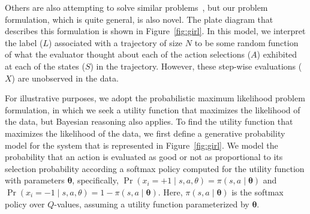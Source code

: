 Others are also attempting to solve similar problems~\cite{burchfiel2016distance,shiarlis2016inverse}, 
but our problem formulation, which is quite general, is also novel.
%
The plate diagram that describes this formulation is shown
in Figure~\ref{fig:girl}.  In this model, we interpret the label ($L$)
associated with a trajectory of size $N$ to be some random function of
what the evaluator thought about each of the action selections ($A$)
exhibited at each of the states ($S$) in the trajectory.  However,
these step-wise evaluations ($X$) are unobserved in the data.

For illustrative purposes, we adopt the probabilistic maximum
likelihood problem formulation, in which we seek a utility function
that maximizes the likelihood of the data, but Bayesian reasoning also
applies.
%
To find the utility function that maximizes the likelihood of the data,
we first define a generative probability model for the system that is represented
in Figure~\ref{fig:girl}.
%
We model the probability that an action is evaluated as good or not as
proportional to its selection probability according a softmax policy
computed for the utility function with parameters
$\bm{\theta}$, specifically,
$\Pr(x_i = +1 \mid s, a, \theta) = \pi(s, a \mid \bm{\theta})$ and
$\Pr(x_i = -1 \mid s, a, \theta) = 1 - \pi(s, a \mid \bm{\theta})$.
%
Here, $\pi(s, a \mid \bm{\theta})$ is the softmax policy over $Q$-values,
assuming a utility function parameterized by $\bm{\theta}$.


